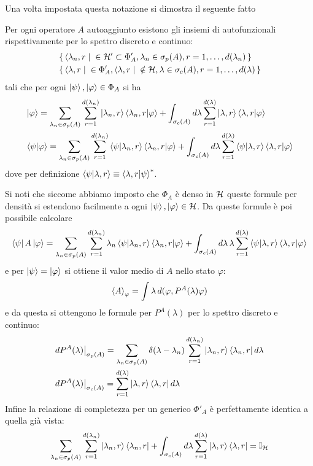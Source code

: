 \documentclass[../../FisicaTeorica.tex]{subfiles}
\begin{document}
Una volta impostata questa notazione si dimostra il seguente fatto
\begin{thm}
Per ogni operatore $A$ autoaggiunto esistono gli insiemi di autofunzionali rispettivamente per lo spettro discreto e continuo:
\begin{align}
& \set{\bra{\lambda_{n},r} \in \mathcal{H}' \subset \Phi'_A, \lambda_n \in \sigma_p(A), r = 1,\dots,d(\lambda_n)} \notag \\
& \set{\bra{\lambda,r} \in \Phi'_A, \bra{\lambda,r} \notin \mathcal{H}, \lambda \in \sigma_c(A), r = 1, \dots, d(\lambda)} \notag
\end{align}
tali che per ogni $\ket\psi, \ket\varphi \in \Phi_A$ si ha
\begin{align}
& \ket\varphi = \sum_{\lambda_n \in \sigma_p(A)} \sum_{r = 1}^{d(\lambda_n)} \ket{\lambda_n, r} \braket{\lambda_n, r | \varphi} + \int_{\sigma_c(A)} d\lambda \sum_{r = 1}^{d(\lambda)} {\ket{\lambda,r} \braket{\lambda,r | \varphi}} \notag \\
& \braket{\psi | \varphi} = \sum_{\lambda_n \in \sigma_p(A)} \sum_{r = 1}^{d(\lambda_n)} \braket{\psi | \lambda_n, r} \braket{\lambda_n, r | \varphi} + \int_{\sigma_c(A)} d\lambda \sum_{r = 1}^{d(\lambda)} \braket{\psi | \lambda,r} \braket{\lambda,r | \varphi} \notag
\end{align}
dove per definizione $\braket{\psi | \lambda,r} \equiv \braket{\lambda,r | \psi}^*$.
\end{thm}
Si noti che siccome abbiamo imposto che $\Phi_A$ è denso in $\mathcal{H}$ queste formule per densità si estendono facilmente a ogni $\ket{\psi}, \ket\varphi \in \mathcal{H}$. Da queste formule è poi possibile calcolare
\[
\bra\psi A \ket\varphi = \sum_{\lambda_n \in \sigma_p(A)} \sum_{r = 1}^{d(\lambda_n)} \lambda_n \braket{\psi | \lambda_n, r} \braket{\lambda_n, r | \varphi} + \int_{\sigma_c(A)} d\lambda \, \lambda \sum_{r = 1}^{d(\lambda)} \braket{\psi | \lambda,r} \braket{\lambda,r | \varphi}
\]
e per $\ket\psi = \ket\varphi$ si ottiene il valor medio di $A$ nello stato $\varphi$:
\[
\left\langle{A}\right\rangle_\varphi = \int \lambda \, d (\varphi, P^A(\lambda) \varphi)
\]
e da questa si ottengono le formule per $P^A(\lambda)$ per lo spettro discreto e continuo:
\begin{align}
& d P^A(\lambda) \big|_{\sigma_p(A)} = \sum_{\lambda_n \in \sigma_p(A)} \delta(\lambda - \lambda_n) \sum_{r = 1}^{d(\lambda_n)} \ket{\lambda_n, r} \bra{\lambda_n, r} d \lambda \notag \\
& d P^A(\lambda) \big|_{\sigma_c(A)} = \sum_{r = 1}^{d(\lambda)} \ket{\lambda, r} \bra{\lambda, r} d\lambda \notag
\end{align}
Infine la relazione di completezza per un generico $\Phi'_A$ è perfettamente identica a quella già vista:
\[
\sum_{\lambda_n \in \sigma_p(A)} \sum_{r = 1}^{d(\lambda_n)} \ket{\lambda_n, r} \bra{\lambda_n, r} + \int_{\sigma_c(A)} d\lambda \sum_{r = 1}^{d(\lambda)} \ket{\lambda,r} \bra{\lambda,r} = {\mathbb I}_{\mathcal{H}}
\]
\end{document}
